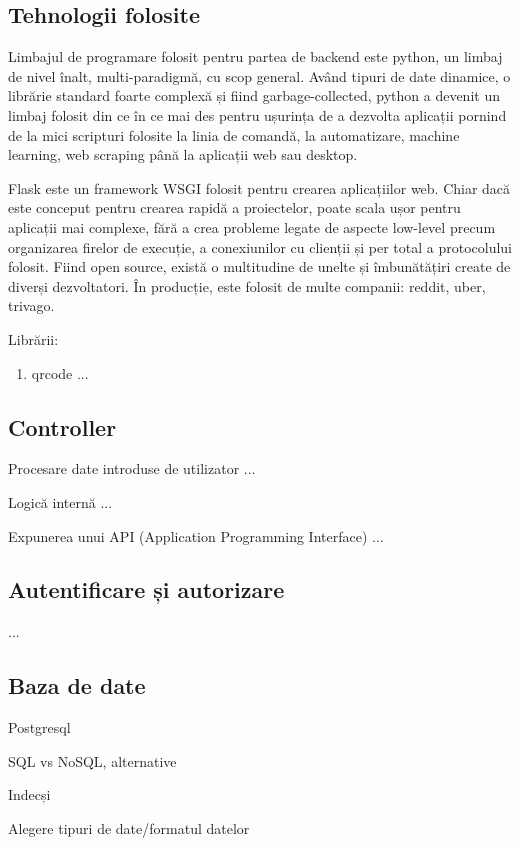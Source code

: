     \subsection{Tehnologii folosite}
    \label{Backend-tehnologii}
    Limbajul de programare folosit pentru partea de backend este python, un limbaj de nivel înalt, multi-paradigmă, cu scop general. Având tipuri de date dinamice, o librărie standard foarte complexă și fiind garbage-collected, python a devenit un limbaj folosit din ce în ce mai des pentru ușurința de a dezvolta aplicații pornind de la mici scripturi folosite la linia de comandă, la automatizare, machine learning, web scraping până la aplicații web sau desktop. 

    Flask este un framework WSGI folosit pentru crearea aplicațiilor web. Chiar dacă este conceput pentru crearea rapidă a proiectelor, poate scala ușor pentru aplicații mai complexe, fără a crea probleme legate de aspecte low-level precum organizarea firelor de execuție, a conexiunilor cu clienții și per total a protocolului folosit. Fiind open source, există o multitudine de unelte și îmbunătățiri create de diverși dezvoltatori. În producție, este folosit de multe companii: reddit, uber, trivago.

    Librării:
    \begin{enumerate}[noitemsep]
        \item qrcode ...
    \end{enumerate}

    \subsection{Controller}
    \label{Controller}
    Procesare date introduse de utilizator ...

    Logică internă ...

    Expunerea unui API (Application Programming Interface) ...
    \subsection{Autentificare și autorizare}
    \label{Autentificare}
    ...
    \subsection{Baza de date}
    \label{Baza de date}
    Postgresql

    SQL vs NoSQL, alternative

    Indecși

    Alegere tipuri de date/formatul datelor
